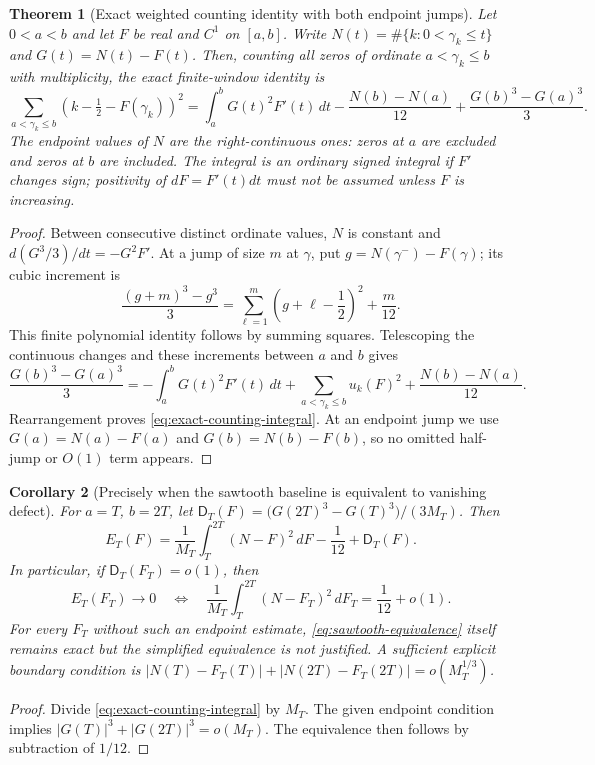 \documentclass[11pt,reqno]{amsart}
\numberwithin{equation}{section}
\newtheorem{theorem}{Theorem}[section]
\newtheorem{corollary}[theorem]{Corollary}
\begin{document}
\begin{theorem}[Exact weighted counting identity with both endpoint jumps]
\label{thm:exact-counting-integral}
Let $0<a<b$ and let $F$ be real and $C^1$ on $[a,b]$.
Write $N(t)=\#\{k:0<\gamma_k\le t\}$ and $G(t)=N(t)-F(t)$.
Then, counting all zeros of ordinate $a<\gamma_k\le b$
with multiplicity, the \emph{exact} finite-window identity is
\begin{equation}\label{eq:exact-counting-integral}
 \boxed{\displaystyle
 \sum_{a<\gamma_k\le b}\left(k-\tfrac12-F(\gamma_k)\right)^2
 =\int_a^b G(t)^2F'(t)\,dt -\frac{N(b)-N(a)}{12}
 +\frac{G(b)^3-G(a)^3}{3}. }
\end{equation}
The endpoint values of $N$ are the right-continuous ones: zeros
at $a$ are excluded and zeros at $b$ are included. The integral
is an ordinary signed integral if $F'$ changes sign; positivity
of $dF=F'(t)dt$ must not be assumed unless $F$ is increasing.
\end{theorem}
\begin{proof}
Between consecutive distinct ordinate values, $N$ is constant
and $d(G^3/3)/dt=-G^2F'$.  At a jump of size $m$ at $\gamma$,
put $g=N(\gamma^-)-F(\gamma)$; its cubic increment is
\[
 \frac{(g+m)^3-g^3}{3}
 =\sum_{\ell=1}^m\left(g+\ell-\frac12\right)^2
 +\frac m{12}.
\]
This finite polynomial identity follows by summing squares.
Telescoping the continuous changes and these increments between
$a$ and $b$ gives
\[
 \frac{G(b)^3-G(a)^3}{3}
 =-\int_a^b G(t)^2F'(t)\,dt
 +\sum_{a<\gamma_k\le b}u_k(F)^2
 +\frac{N(b)-N(a)}{12}.
\]
Rearrangement proves \eqref{eq:exact-counting-integral}.
At an endpoint jump we use $G(a)=N(a)-F(a)$ and
$G(b)=N(b)-F(b)$, so no omitted half-jump or $O(1)$ term appears.
\end{proof}

\begin{corollary}[Precisely when the sawtooth baseline is equivalent to vanishing defect]
\label{cor:sawtooth-equivalence}
For $a=T$, $b=2T$, let
$\mathsf D_T(F)=\bigl(G(2T)^3-G(T)^3\bigr)/(3M_T)$.
Then
\begin{equation}\label{eq:sawtooth-equivalence}
 E_T(F)=\frac1{M_T}\int_T^{2T}(N-F)^2\,dF
          -\frac1{12}+\mathsf D_T(F).
\end{equation}
In particular, \emph{if} $\mathsf D_T(F_T)=o(1)$, then
\[
 E_T(F_T)\longrightarrow0\quad\Longleftrightarrow\quad
 \frac1{M_T}\int_T^{2T}(N-F_T)^2\,dF_T
              =\frac1{12}+o(1).
\]
For every $F_T$ without such an endpoint estimate,
\eqref{eq:sawtooth-equivalence} itself remains exact but the
simplified equivalence is not justified. A sufficient explicit
boundary condition is
$|N(T)-F_T(T)|+|N(2T)-F_T(2T)|=o(M_T^{1/3})$.
\end{corollary}
\begin{proof}
Divide \eqref{eq:exact-counting-integral} by $M_T$.
The given endpoint condition implies
$|G(T)|^3+|G(2T)|^3=o(M_T)$.
The equivalence then follows by subtraction of $1/12$.
\end{proof}
\end{document}
